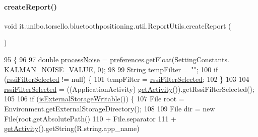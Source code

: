 \paragraph{\texorpdfstring{create\+Report()}{createReport()}}
{\footnotesize\ttfamily void it.\+unibo.\+torsello.\+bluetoothpositioning.\+util.\+Report\+Utils.\+create\+Report (\begin{DoxyParamCaption}{ }\end{DoxyParamCaption})}


\begin{DoxyCode}
95                                \{
96 
97         \textcolor{keywordtype}{double} \hyperlink{classit_1_1unibo_1_1torsello_1_1bluetoothpositioning_1_1util_1_1ReportUtils_ab1f0b60e037c211df9cc6dc34ebb8030_ab1f0b60e037c211df9cc6dc34ebb8030}{processNoise} = \hyperlink{classit_1_1unibo_1_1torsello_1_1bluetoothpositioning_1_1util_1_1ReportUtils_af1f57227f8c42073b4f8f2b65e86ebd7_af1f57227f8c42073b4f8f2b65e86ebd7}{preferences}.getFloat(SettingConstants.
      KALMAN\_NOISE\_VALUE, 0);
98 
99         String tempFilter = \textcolor{stringliteral}{""};
100         \textcolor{keywordflow}{if} (\hyperlink{classit_1_1unibo_1_1torsello_1_1bluetoothpositioning_1_1util_1_1ReportUtils_ad51884bc9ff99e0ed1e7d5f8054de6da_ad51884bc9ff99e0ed1e7d5f8054de6da}{rssiFilterSelected} != null) \{
101             tempFilter = \hyperlink{classit_1_1unibo_1_1torsello_1_1bluetoothpositioning_1_1util_1_1ReportUtils_ad51884bc9ff99e0ed1e7d5f8054de6da_ad51884bc9ff99e0ed1e7d5f8054de6da}{rssiFilterSelected};
102         \}
103 
104         \hyperlink{classit_1_1unibo_1_1torsello_1_1bluetoothpositioning_1_1util_1_1ReportUtils_ad51884bc9ff99e0ed1e7d5f8054de6da_ad51884bc9ff99e0ed1e7d5f8054de6da}{rssiFilterSelected} = ((ApplicationActivity) 
      \hyperlink{classit_1_1unibo_1_1torsello_1_1bluetoothpositioning_1_1util_1_1ReportUtils_a397da2904c606315301d19eb39451181_a397da2904c606315301d19eb39451181}{getActivity}()).getRssiFilterSelected();
105 
106         \textcolor{keywordflow}{if} (\hyperlink{classit_1_1unibo_1_1torsello_1_1bluetoothpositioning_1_1util_1_1ReportUtils_a58e7513f3cbe12723359b8dee541ed14_a58e7513f3cbe12723359b8dee541ed14}{isExternalStorageWritable}()) \{
107             File root = Environment.getExternalStorageDirectory();
108 
109             File dir = \textcolor{keyword}{new} File(root.getAbsolutePath()
110                     + File.separator
111                     + \hyperlink{classit_1_1unibo_1_1torsello_1_1bluetoothpositioning_1_1util_1_1ReportUtils_a397da2904c606315301d19eb39451181_a397da2904c606315301d19eb39451181}{getActivity}().getString(R.string.app\_name)

\end{DoxyCode}
